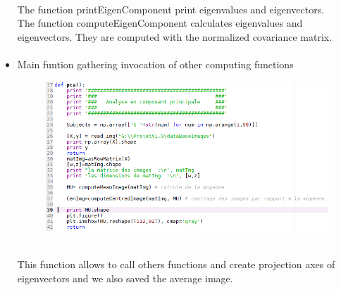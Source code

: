 \begin{itemize}
\begin{figure}[bth]
\begin{center}
\end {center}
\end{figure}
\\The function printEigenComponent print eigenvalues and eigenvectors.
\\The function computeEigenComponent calculates  eigenvalues and eigenvectors. They are computed with the normalized covariance matrix.
\paragraph{}
\item Main funtion gathering invocation of other computing functions 
\begin{figure}[bth]%
\begin{center}
\includegraphics[scale=0.75]{affich_MeanImg}%
\end {center}
\end{figure}
\\This function allows to call others functions and create projection axes of eigenvectors and we also saved the average image.


\end{itemize}


